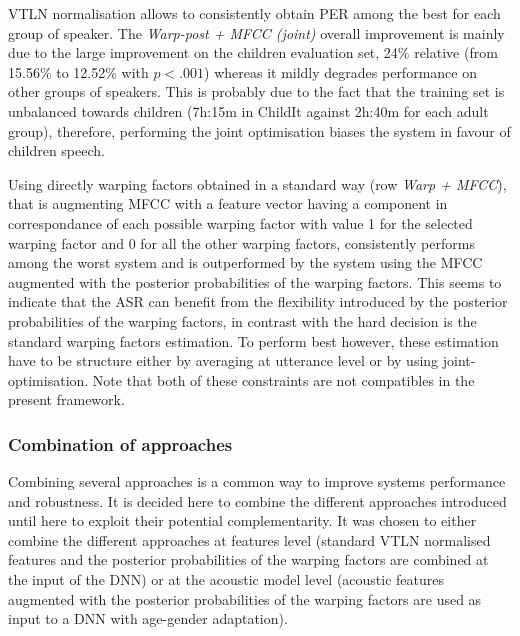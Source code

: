 \documentclass{nle}
\begin{document}
VTLN normalisation allows to consistently obtain PER among the best for each group of speaker. The {\em Warp-post + MFCC (joint)} overall improvement is mainly due to the large improvement on the children evaluation set, 24\% relative (from 15.56\% to 12.52\% with $p  <.001$) whereas it mildly degrades performance on other groups of speakers. This is probably due to the fact that the training set is unbalanced towards children (7h:15m in ChildIt against 2h:40m for each adult group), therefore, performing the joint optimisation biases the system in favour of children speech.

Using directly warping factors obtained in a standard way  (row {\em Warp + MFCC}),  that is augmenting MFCC with a feature vector having a component in correspondance of  each possible warping factor with value 1 for the selected warping factor and 0 for all the other warping factors,  consistently performs among the worst system and is outperformed by the system using the MFCC augmented with the posterior probabilities of the warping factors. This seems to indicate that the ASR can benefit from the flexibility introduced by the posterior probabilities of the warping factors, in contrast with the hard decision is the standard warping factors estimation. To perform best however, these estimation have to be structure either by averaging at utterance level or by using joint-optimisation. Note that both of these constraints are not compatibles in the present framework.


\subsubsection{Combination of approaches}

%
%
Combining several approaches is a common way to improve systems performance and robustness. It is decided here to combine the different approaches introduced until here to exploit their potential complementarity. 
It was chosen to either combine the different approaches at features level (standard VTLN normalised features and the posterior probabilities of the warping factors are combined at the input of the DNN) or at the acoustic model level (acoustic features augmented with the posterior probabilities of the warping factors are used as input to a DNN with age-gender adaptation).
\end{document}
